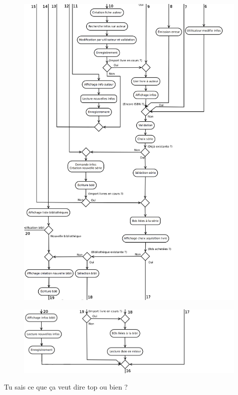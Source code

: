 \begin{figure}[h!]
\begin{center}
\includegraphics[width=16cm]{uml/appli_pc/p3.png}
\end{center}
\end{figure}
\newpage{}

\begin{figure}[t!]
\includegraphics[width=16cm]{uml/appli_pc/p4.png}
\end{figure}

Tu sais ce que ça veut dire top ou bien ?


